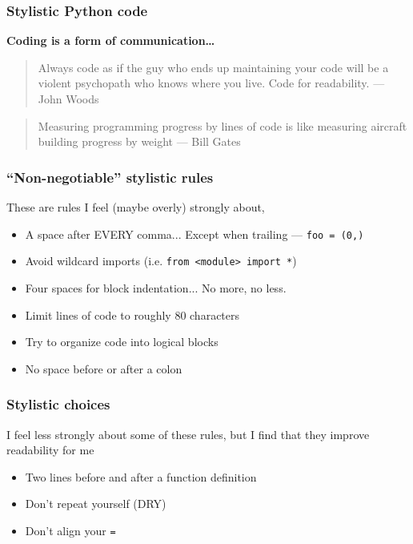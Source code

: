 \documentclass[10pt]{beamer}
\begin{document}
  \begin{frame} \frametitle{Stylistic Python code}

    \textbf{Coding is a form of communication\dots}

    \vspace{0.5cm}

    \begin{quote}
      Always code as if the guy who ends up maintaining your code will be a violent psychopath who
      knows where you live. Code for readability. --- John Woods
    \end{quote}

    \vspace{0.2cm}

    \begin{quote}
      Measuring programming progress by lines of code is like measuring aircraft building progress
      by weight --- Bill Gates
    \end{quote}

  \end{frame}

  \begin{frame} \frametitle{``Non-negotiable'' stylistic rules}

    These are rules I feel (maybe overly) strongly about,

    \begin{itemize}
      \item A space after EVERY comma... Except when trailing --- \texttt{foo = (0,)}
      \item Avoid wildcard imports (i.e. \texttt{from <module> import *})
      \item Four spaces for block indentation... No more, no less.
      \item Limit lines of code to roughly 80 characters
      \item Try to organize code into logical blocks
      \item No space before or after a colon
    \end{itemize}

  \end{frame}

  \begin{frame} \frametitle{Stylistic choices}

    I feel less strongly about some of these rules, but I find that they improve readability for me

    \begin{itemize}
      \item Two lines before and after a function definition
      \item Don't repeat yourself (DRY)
      \item Don't align your \texttt{=}
    \end{itemize}

  \end{frame}
\end{document}
